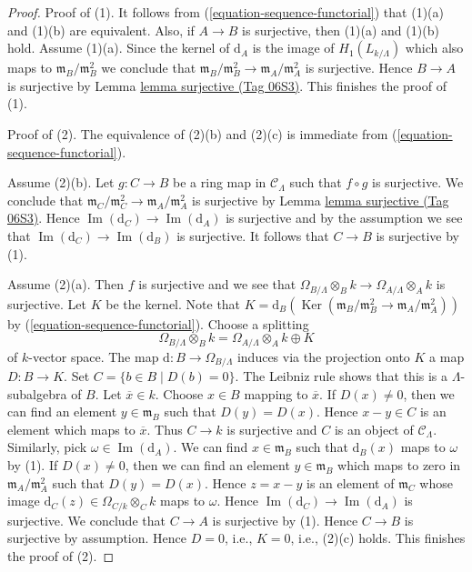 \documentclass{amsart}
\theoremstyle{plain}
\theoremstyle{definition}
\theoremstyle{remark}
\numberwithin{equation}{subsection}
\def\Ker{\mathop{\mathrm{Ker}}}
\def\Im{\mathop{\mathrm{Im}}}
\begin{document}
\begin{proof}
Proof of (1). It follows from (\ref{equation-sequence-functorial})
that (1)(a) and (1)(b) are equivalent. Also, if
$A \to B$ is surjective, then (1)(a) and (1)(b) hold. Assume (1)(a).
Since the kernel of $\text{d}_A$ is the image of
$H_1(L_{k/\Lambda})$ which also maps to
$\mathfrak m_B/\mathfrak m_B^2$ we conclude that
$\mathfrak m_B/\mathfrak m_B^2 \to \mathfrak m_A/\mathfrak m_A^2$
is surjective. Hence $B \to A$ is surjective by
Lemma \href{https://stacks.math.columbia.edu/tag/06S3}{lemma surjective (Tag 06S3)}. This finishes the proof of (1).

\medskip\noindent
Proof of (2). The equivalence of (2)(b) and (2)(c) is immediate from
(\ref{equation-sequence-functorial}).

\medskip\noindent
Assume (2)(b). Let $g : C \to B$ be a ring map in $\mathcal{C}_\Lambda$
such that $f \circ g$ is surjective. We conclude that
$\mathfrak m_C/\mathfrak m_C^2 \to \mathfrak m_A/\mathfrak m_A^2$
is surjective by
Lemma \href{https://stacks.math.columbia.edu/tag/06S3}{lemma surjective (Tag 06S3)}.
Hence
$\Im(\text{d}_C) \to \Im(\text{d}_A)$ is surjective
and by the assumption we see that
$\Im(\text{d}_C) \to \Im(\text{d}_B)$ is surjective.
It follows that $C \to B$ is surjective by (1).

\medskip\noindent
Assume (2)(a). Then $f$ is surjective and we see that
$\Omega_{B/\Lambda} \otimes_B k \to \Omega_{A/\Lambda} \otimes_A k$
is surjective. Let $K$ be the kernel. Note that
$K = \text{d}_B(\Ker(\mathfrak m_B/\mathfrak m_B^2 \to
\mathfrak m_A/\mathfrak m_A^2))$ by (\ref{equation-sequence-functorial}).
Choose a splitting
$$
\Omega_{B/\Lambda} \otimes_B k =
\Omega_{A/\Lambda} \otimes_A k \oplus K
$$
of $k$-vector space. The map $\text{d} : B \to \Omega_{B/\Lambda}$
induces via the projection onto $K$ a map $D : B \to K$. Set
$C = \{b \in B \mid D(b) = 0\}$. The Leibniz rule shows that this is
a $\Lambda$-subalgebra of $B$. Let $\overline{x} \in k$. Choose $x \in B$
mapping to $\overline{x}$. If $D(x) \not = 0$, then we can find an element
$y \in \mathfrak m_B$ such that $D(y) = D(x)$. Hence $x - y \in C$ is
an element which maps to $\overline{x}$. Thus $C \to k$ is surjective
and $C$ is an object of $\mathcal{C}_\Lambda$. Similarly, pick
$\omega \in \Im(\text{d}_A)$. We can find $x \in \mathfrak m_B$
such that $\text{d}_B(x)$ maps to $\omega$ by (1). If $D(x) \not = 0$, then
we can find an element $y \in \mathfrak m_B$ which maps to zero
in $\mathfrak m_A/\mathfrak m_A^2$ such that $D(y) = D(x)$.
Hence $z = x - y$ is an element of $\mathfrak m_C$ whose
image $\text{d}_C(z) \in \Omega_{C/k} \otimes_C k$ maps to $\omega$.
Hence $\Im(\text{d}_C) \to \Im(\text{d}_A)$ is surjective.
We conclude that $C \to A$ is surjective by (1). Hence $C \to B$ is
surjective by assumption. Hence $D = 0$, i.e., $K = 0$, i.e., (2)(c) holds.
This finishes the proof of (2).


\end{proof}
\end{document}
